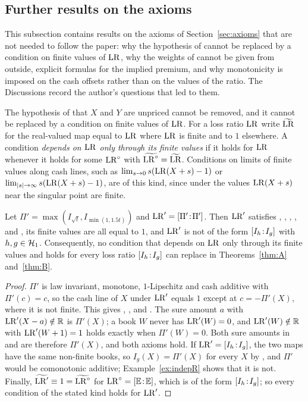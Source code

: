 \subsection{Further results on the axioms}\label{supp:axioms-more}

This subsection contains results on the axioms of Section~\ref{sec:axioms} that are not needed to follow the paper:
why the hypothesis of \axR{} cannot be replaced by a condition on finite values of $\mathrm{LR}$, why the weights of \axCM{}
cannot be given from outside, explicit formulas for the implied premium, and why monotonicity is imposed on the
cash offsets rather than on the values of the ratio. The Discussions record the author's questions that led to them.

The hypothesis of \axR{} that $X$ and $Y$ are unpriced cannot be removed, and it cannot be replaced by a condition on finite
values of $\mathrm{LR}$. For a loss ratio $\mathrm{LR}$ write $\widetilde{\mathrm{LR}}$ for the real-valued map equal to $\mathrm{LR}$ where $\mathrm{LR}$ is
finite and to $1$ elsewhere. A condition \emph{depends on $\mathrm{LR}$ only through its finite values} if it holds for
$\mathrm{LR}$ whenever it holds for some $\mathrm{LR}^\circ$ with $\widetilde{\mathrm{LR}^\circ}=\widetilde{\mathrm{LR}}$. Conditions on limits
of finite values along cash lines, such as $\lim_{s\to0}s(\mathrm{LR}(X+s)-1)$ or $\lim_{|s|\to\infty}s(\mathrm{LR}(X+s)-1)$, are of
this kind, since under \axP{} the values $\mathrm{LR}(X+s)$ near the singular point are finite.

\begin{proposition}\label{prop:nofinite}
Let $\Pi'=\max(I_{\sqrt t},I_{\min(1,1.5t)})$ and $\mathrm{LR}'=[\Pi'\!:\!\Pi']$. Then $\mathrm{LR}'$ satisfies \axPe, \axP,
\axN, \axLI, \axRC{} and \axRM, its finite values are all equal to $1$, and $\mathrm{LR}'$ is not of the form
$[I_h\!:\!I_g]$ with $h,g\in\mathcal H_1$. Consequently, no condition that depends on $\mathrm{LR}$ only through its finite
values and holds for every loss ratio $[I_h\!:\!I_g]$ can replace \axR{} in Theorems~\ref{thm:A}
and~\ref{thm:B}.
\end{proposition}

\begin{proof}
$\Pi'$ is law invariant, monotone, $1$-Lipschitz and cash additive with $\Pi'(c)=c$, so the cash line of $X$ under
$\mathrm{LR}'$ equals $1$ except at $c=-\Pi'(X)$, where it is not finite. This gives \axPe, \axP, \axN{} and \axLI. The sure
amount $a$ with $\mathrm{LR}'(X-a)\notin\mathbb R$ is $\Pi'(X)$; a book $W$ never has $\mathrm{LR}'(W)=0$, and $\mathrm{LR}'(W)\notin\mathbb R$ with
$\mathrm{LR}'(W+1)=1$ holds exactly when $\Pi'(W)=0$. Both sure amounts in \axRC{} and \axRM{} are therefore $\Pi'(X)$, and
both axioms hold. If $\mathrm{LR}'=[I_h\!:\!I_g]$, the two maps have the same non-finite books, so $I_g(X)=\Pi'(X)$ for
every $X$ by \axP, and $\Pi'$ would be comonotonic additive; Example~\ref{ex:indepR} shows that it is not. Finally,
$\widetilde{\mathrm{LR}'}\equiv1=\widetilde{\mathrm{LR}^\circ}$ for $\mathrm{LR}^\circ=[\mathbb E\!:\!\mathbb E]$, which is of the form
$[I_h\!:\!I_g]$; so every condition of the stated kind holds for $\mathrm{LR}'$. \qedhere
\end{proof}

